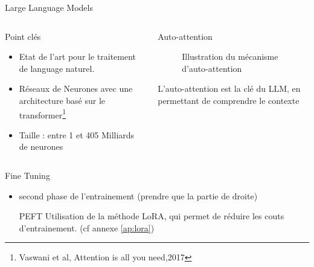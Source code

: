 
\begin{frame}{Large Language Models}
   \begin{columns}
         
       \begin{column}[t]{0.45\textwidth} 
       \begin{block}{Point clés}
           \begin{itemize}
               \item Etat de l'art pour le traitement de language naturel.
               \item Réseaux de Neurones avec une architecture basé sur le  transformer\footnote{Vaswani et al, Attention is all you need,2017 }
               \item Taille : entre 1 et 405 Milliards de neurones
           \end{itemize}
               
       \end{block}
       \end{column}
           
       \begin{column}[t]{0.55\textwidth}
       \begin{block}{Auto-attention}
           \begin{figure}
               \centering
               
               \caption{Illustration du mécanisme d'auto-attention}
           \end{figure}    
           L'auto-attention est la clé du LLM, en permettant de comprendre le contexte
       \end{block}  
       \end{column}
            
   \end{columns}
   \end{frame}


\begin{frame}{Fine Tuning}
    \begin{itemize}
        \item second phase de l'entrainement (prendre que la partie de droite)
        
        \begin{block}{PEFT}
            Utilisation de la méthode LoRA, qui permet de réduire les couts d'entrainement. (cf annexe \ref{ap:lora})
            
        \end{block}
    \end{itemize}
   
\end{frame}

